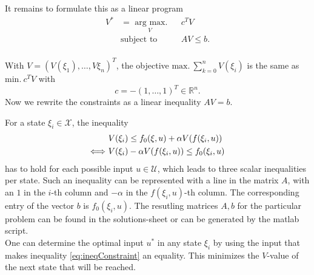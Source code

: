 \documentclass[]{article}
\newcommand{\trp}{^T}
\newcommand{\Rn}{\mathbb{R}^n}
\newcommand{\fnull}{f_0}
\newcommand{\X}{\mathcal{X}}
\newcommand{\U}{\mathcal{U}}
\newcommand{\Vopt}{\Vind{*}}
\newcommand{\Vind}[1]{V^#1}
\newcommand{\uopt}{u^*}
\begin{document}
\begin{enumerate}
			It remains to formulate this as a linear program
			\begin{equation} \label{eq:maxProblemArgmax}
				\begin{aligned}
				\Vopt &=  \underset{V}{\text{ arg max.}}
				& & c\trp V\\
				& \text{subject to}
				& & AV \leq b.\\
				\end{aligned}
			\end{equation}
			
			 With $ V = (V(\xi_1),\dots,V\xi_n)\trp $, the objective $\mathrm{max.} \ \sum_{k=0}^{n} V(\xi_i) $ is the same as $ \mathrm{min.} \ c\trp V $ with \[ c = -(1,\dots,1)\trp \in \Rn. \]
			 Now we rewrite the constraints as a linear inequality $ AV = b $.
			 
			 For a state $ \xi_i \in \X $, the inequality
			 \begin{align}
			  	&V(\xi_i) \leq \fnull (\xi,u) +  \alpha V(f(\xi_i,u))\notag\\
			 \Longleftrightarrow \ &V(\xi_i) - \alpha V(f(\xi_i,u)) \leq \fnull(\xi_i,u) \label{eq:linineq}
			 \end{align}
			has to hold for each possible input $ u \in \U $, which leads to three scalar inequalities per state. Such an inequality can be represented with a line in the matrix $ A $, with an $ 1 $ in the  $ i $-th column and $ -\alpha $ in the $ f(\xi_i,u) $-th column. The corresponding entry of the vector $ b $ is $ \fnull(\xi_i,u) $. The resutling matrices $ A,b $ for the particular problem can be found in the solutions-sheet or can be generated by the matlab script.\\
			One can determine the optimal input $ \uopt $ in any state $ \xi_i $ by using the input that makes inequality \eqref{eq:ineqConstraint} an equality. This minimizes the $ V $-value of the next state that will be reached.
		\end{enumerate} 
\end{document}
